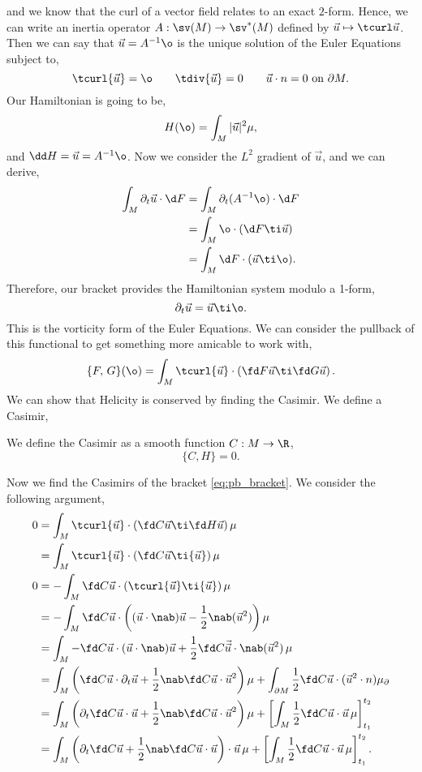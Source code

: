 and we know that the curl of a vector field relates to an exact $2$-form. Hence, we can write an inertia operator $A : \sv(M) \to \sv^*(M)$ defined by $\vec u \mapsto \tcurl \vec u$. Then we can say that $\vec u = A^{-1}\o$ is the unique solution of the Euler Equations subject to,
$$ \tcurl {\vec u} = \o \qquad \tdiv {\vec u} = 0 \qquad {\vec u} \cdot n = 0 \text{ on }\partial M. $$
Our Hamiltonian is going to be,
$$ H(\o) = \int_M |\vec u|^2 \mu, $$
and $\dd H = \vec u = A^{-1}\o$. Now we consider the $L^2$ gradient of $\vec u$, and we can derive,
\begin{align*}
  \int_M \partial_t \vec u \cdot \d F &= \int_M \partial_t (A^{-1}\o) \cdot \d F \\
  &= \int_M \o \cdot (\d F \ti \vec u)\\
  &= \int_M \d F \cdot (\vec u \ti \o).
\end{align*}
Therefore, our bracket provides the Hamiltonian system modulo a 1-form,
$$ \partial_t \vec u = \vec u \ti \o. $$
This is the vorticity form of the Euler Equations. We can consider the pullback of this functional to get something more amicable to work with,
\begin{equation}
  \{F,\, G\}(\o) = \int_M \tcurl {\vec u} \cdot \left( \fd F {\vec u} \ti \fd G {\vec u}  \right).\label{eq:pb_bracket}
\end{equation}
We can show that Helicity is conserved by finding the Casimir. We define a Casimir,
\begin{ndefi}[Casimir]
  We define the Casimir as a smooth function $C : M \to \R$,
  $$ \{C, H\} = 0. $$
\end{ndefi}
\noindent
Now we find the Casimirs of the bracket \eqref{eq:pb_bracket}. We consider the following argument,
\begin{align*}
  0 &= \int_M \tcurl {\vec u} \cdot \left( \fd C {\vec u} \ti \fd H {\vec u}  \right)\mu \\
  &= \int_M \tcurl {\vec u} \cdot \left( \fd C {\vec u} \ti {\vec u}  \right)\mu \\
  0 &= - \int_M \fd C {\vec u} \cdot \left( \tcurl {\vec u} \ti {\vec u} \right)\mu \\
  &= - \int_M \fd C {\vec u} \cdot \left( ({\vec u} \cdot \nab){\vec u} - \frac{1}{2}\nab({\vec u}^2) \right)\mu \\
  &= \int_M -\fd C {\vec u} \cdot ({\vec u} \cdot\nab){\vec u} + \frac{1}{2}\fd C {\vec {\vec u}} \cdot \nab({\vec u}^2)\,\mu \\
  &= \int_M \left(\fd C {\vec u} \cdot \partial_t {\vec u} + \frac{1}{2}\nab\fd C {\vec u} \cdot {\vec u}^2\right) \mu + \int_{\partial M} \frac{1}{2}\fd C {\vec u} \cdot (\vec u^2 \cdot n) \mu_\partial  \\
  &= \int_M \left(\partial_t\fd C {\vec u} \cdot {\vec u} + \frac{1}{2}\nab\fd C {\vec u} \cdot {\vec u}^2\right) \mu + \left[\int_M \frac{1}{2}\fd C {\vec u} \cdot {\vec u}\,\mu\right]_{t_1}^{t_2} \\
  &= \int_M \left(\partial_t\fd C {\vec u} + \frac{1}{2}\nab\fd C {\vec u} \cdot {\vec u}\right) \cdot {\vec u}\, \mu + \left[\int_M \frac{1}{2}\fd C {\vec u} \cdot {\vec u}\,\mu\right]_{t_1}^{t_2}.
\end{align*}
